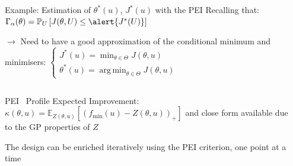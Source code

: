 \documentclass[10pt,aspectratio=169,usepdftitle=false]{beamer}
\newcommand\manupath{/home/victor/acadwriting/Manuscrit/Text/}
\newcommand{\Kspace}{\Theta}
\newcommand{\Ex}{\mathbb{E}}
\newcommand{\Prob}{\mathbb{P}}
\DeclareMathOperator*{\argmin}{arg\,min}
\newcommand{\kk}{\theta}
\newcommand{\uu}{u}
\newcommand{\UU}{U}
\newcommand{\inputpgf}[2][\textwidth]{
  \renewcommand\rmfamily{\sffamily}
  \resizebox{#1}{!}{}}
\begin{document}
\begin{frame}{Example: Estimation of $\kk^*(\uu)$, $J^*(\uu)$ with the PEI}
  Recalling that: $\Gamma_{\alpha}(\kk) = \Prob_{\UU}\left[J(\kk, \UU) \leq \alert{J^*(\UU)}\right]$
  
  $\rightarrow$ Need to have a good approximation of the conditional minimum and minimisers:
  $\left\{
  \begin{array}{l}
    J^*(\uu) = \min_{\kk\in\Kspace}J(\kk, \uu)\\
    \kk^*(\uu) = \argmin_{\kk\in \Kspace}J(\kk, \uu)
  \end{array}
  \right.$ 
  \begin{columns}
    \begin{column}{0.55\textwidth}
      \begin{block}{PEI~\citep{ginsbourger_bayesian_2014}}
        Profile Expected Improvement:
        $\kappa(\kk, \uu) = \Ex_{Z(\kk, \uu)}\left[
          \left(f_{\min}(\uu) - Z(\kk, \uu)\right)_+\right]$ and close
        form available due to the GP properties of $Z$
      \end{block}
The design can be enriched iteratively using the PEI criterion, one point at a time
\end{column}
\begin{column}{0.45\textwidth}
  \begin{center}
    \inputpgf{\manupath Chapter4/img/PEI_example.pgf}
  \end{center}
\end{column}
\end{columns}
\end{frame}
\end{document}
